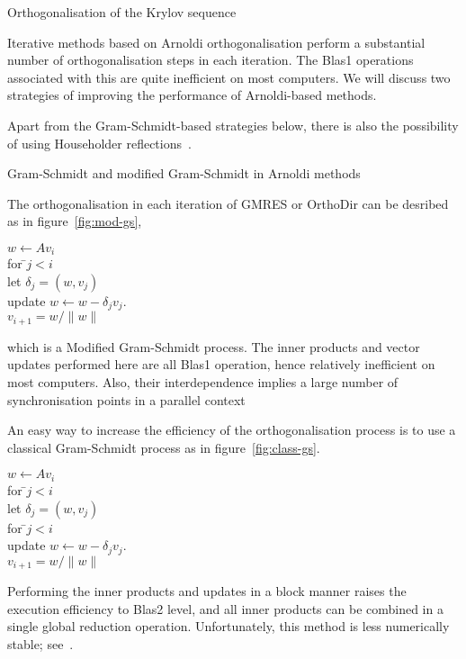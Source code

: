 \documentclass[11pt]{artikel3}
\begin{document}
\begin{Outline}
 {Orthogonalisation of the Krylov sequence}

Iterative methods based on Arnoldi orthogonalisation perform
a substantial number of orthogonalisation steps in each iteration.
The Blas1 operations associated with this are quite inefficient
on most computers. We will discuss two strategies of improving
the performance of Arnoldi-based methods.

Apart from the Gram-Schmidt-based strategies
below, there is also the possibility of using Householder
reflections~\cite{Walker:householder-gmres}.

 {Gram-Schmidt and modified Gram-Schmidt in Arnoldi methods}
\label{sec:gram-schmidt}

The orthogonalisation in each iteration of GMRES or OrthoDir
can be desribed  as in figure~\ref{fig:mod-gs},
\begin{rfigure}
\begin{tabbing}
$w\leftarrow Av_i$\\
for \=$j<i$\\
\>let $\delta_j=(w,v_j)$\\
\>update $w\leftarrow w-\delta_jv_j$.\\
$v_{i+1} = w/\|w\|$
\end{tabbing}
\caption{Modified Gram-Schmidt orthogonalisation}
\label{fig:mod-gs}
\end{rfigure}
which is a Modified Gram-Schmidt process.
The inner products and vector updates performed here are all
Blas1 operation, hence relatively inefficient on most computers.
Also, their interdependence implies a large number of synchronisation
points in a parallel context

An easy way to increase the efficiency of the orthogonalisation
process is to use  a classical Gram-Schmidt process
as in figure~\ref{fig:class-gs}.
\begin{rfigure}
\begin{tabbing}
$w\leftarrow Av_i$\\
for \=$j<i$\\
\>let $\delta_j=(w,v_j)$\\
for \=$j<i$\\
\>update $w\leftarrow w-\delta_jv_j$.\\
$v_{i+1} = w/\|w\|$
\end{tabbing}
\caption{Classical Gram-Schmidt orthogonalisation}
\label{fig:class-gs}
\end{rfigure}
Performing the inner products and updates in a block manner
raises the execution efficiency to Blas2 level, and all inner products
can be combined in a single global reduction operation.
Unfortunately, this method is less numerically stable;
see~\cite{Bjorck:mod-gs,BjorckPaige:mod-gs,DanielGKS:stable-gs}.


\end{Outline}
\end{document}
